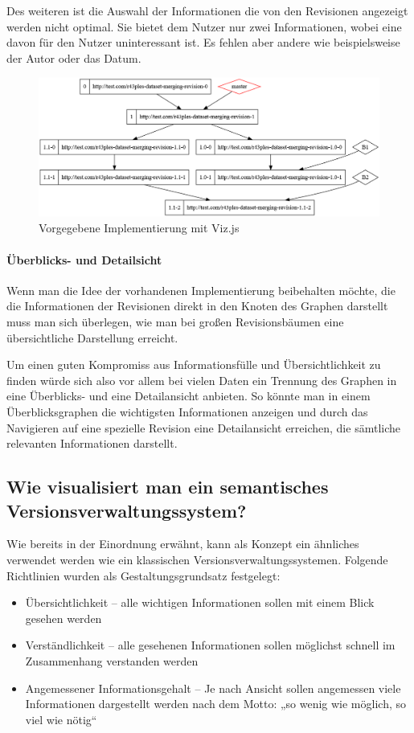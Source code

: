 \documentclass[color, ddc]{tudscrreprt}
\begin{document}
Des weiteren ist die Auswahl der Informationen die von den Revisionen angezeigt werden nicht optimal. Sie bietet dem Nutzer nur zwei Informationen, wobei eine davon für den Nutzer uninteressant ist. Es fehlen aber andere wie beispielsweise der Autor oder das Datum.

\begin{figure}[ht!]
\centering
\includegraphics[width=\textwidth]{Skizzen/vizjs.png}
\caption{Vorgegebene Implementierung mit Viz.js}
\end{figure}

\paragraph{Überblicks- und Detailsicht}

Wenn man die Idee der vorhandenen Implementierung beibehalten möchte, die die Informationen der Revisionen direkt in den Knoten des Graphen darstellt muss man sich überlegen, wie man bei großen Revisionsbäumen eine übersichtliche Darstellung erreicht.

Um einen guten Kompromiss aus Informationsfülle und Übersichtlichkeit zu finden würde sich also vor allem bei vielen Daten ein Trennung des Graphen in eine Überblicks- und eine Detailansicht anbieten. So könnte man in einem Überblicksgraphen die wichtigsten Informationen anzeigen und durch das Navigieren auf eine spezielle Revision eine Detailansicht erreichen, die sämtliche relevanten Informationen darstellt.

\subsection*{Wie visualisiert man ein semantisches Versionsverwaltungssystem?}


Wie bereits in der Einordnung erwähnt, kann als Konzept ein ähnliches verwendet werden wie ein klassischen Versionsverwaltungssystemen. Folgende Richtlinien wurden als Gestaltungsgrundsatz festgelegt:
\begin{itemize}
\item Übersichtlichkeit -- alle wichtigen Informationen sollen mit einem Blick gesehen werden
\item Verständlichkeit -- alle gesehenen Informationen sollen möglichst schnell im Zusammenhang verstanden werden
\item Angemessener Informationsgehalt -- Je nach Ansicht sollen angemessen viele Informationen dargestellt werden nach dem Motto: „so wenig wie möglich, so viel wie nötig“
\end{itemize}
\end{document}
